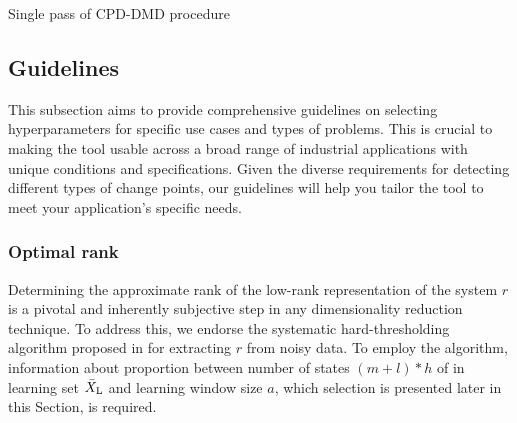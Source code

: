 \begin{algorithm}
	\caption{Single pass of CPD-DMD procedure}\label{alg:cpd-dmd}
	\begin{algorithmic}[1]

	\end{algorithmic}
\end{algorithm}

\subsection{Guidelines}\label{sec:guidelines}
This subsection aims to provide comprehensive guidelines on selecting hyperparameters for specific use cases and types of problems. This is crucial to making the tool usable across a broad range of industrial applications with unique conditions and specifications. Given the diverse requirements for detecting different types of change points, our guidelines will help you tailor the tool to meet your application's specific needs.

\subsubsection{Optimal rank}
Determining the approximate rank of the low-rank representation of the system \( r \) is a pivotal and inherently subjective step in any dimensionality reduction technique. To address this, we endorse the systematic hard-thresholding algorithm proposed in \citet{Gavish2014} for extracting \( r \) from noisy data. To employ the algorithm, information about proportion between number of states \((m + l) * h\) of in learning set \(\bar{X} _{\text{L}}\) and learning window size \(a\), which selection is presented later in this Section, is required.

